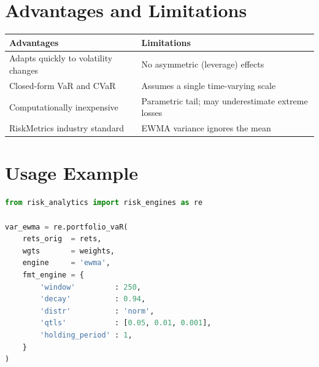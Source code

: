 \documentclass[11pt, a4paper]{article}
\begin{document}
\section{Advantages and Limitations}

\begin{tabular}{p{6cm} p{8cm}}
\toprule
Advantages & Limitations \\
\midrule
Adapts quickly to volatility changes & No asymmetric (leverage) effects \\
Closed-form VaR and CVaR & Assumes a single time-varying scale \\
Computationally inexpensive & Parametric tail; may underestimate extreme losses \\
RiskMetrics industry standard & EWMA variance ignores the mean \\
\bottomrule
\end{tabular}

\section{Usage Example}

\begin{lstlisting}[language=Python]
from risk_analytics import risk_engines as re

var_ewma = re.portfolio_vaR(
    rets_orig  = rets,
    wgts       = weights,
    engine     = 'ewma',
    fmt_engine = {
        'window'         : 250,
        'decay'          : 0.94,
        'distr'          : 'norm',
        'qtls'           : [0.05, 0.01, 0.001],
        'holding_period' : 1,
    }
)
\end{lstlisting}
\end{document}
